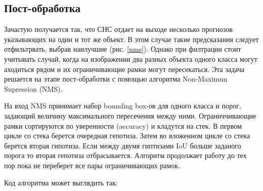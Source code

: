 \subsection{Пост-обработка}

Зачастую получается так, что СНС отдает на выходе несколько прогнозов указывающих на один и тот же объект. В этом случае такие предсказания следует отфильтрвать, выбрав наилучшие (рис. \ref{nms}). Однако при филтрации стоит учитывать случай, когда на изображении два разных объекта одного класса могут аходиться рядом и их ограничивающие рамки могут пересекаться. Эта задача решается на этапе пост-обработки с помощью алгоритма Non-Maximun Supression (NMS).


На вход NMS принимает набор bounding box-ов для одного класса и порог, задающий величину максимального пересечения между ними. Ограниччивающие рамки сортируются по уверенности (accuracy) и кладутся на стек. В первом цикле со стека берется очередная гепотиза. Затем во вложенном цикле со стека берется вторая гипотиза. Если между двумя гиптизами IoU больше заданого порога то вторая гепотиза отбрасывается. Алгоритм продолжает работу до тех пор пока не переберет все пары ограничивающих рамок.

Код алгоритма может выглядить так:


